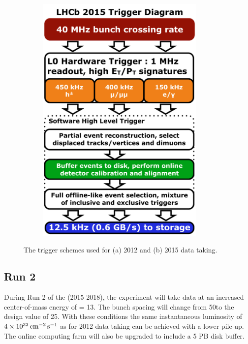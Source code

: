 \begin{figure}[!tb]
\begin{subfigure}{0.49\textwidth}
\includegraphics[width=0.9\textwidth]{figs/detector/trigger-run2.pdf}
\caption{}
\label{fig:trigger:run2}
\end{subfigure}
\caption{The trigger schemes used for (a) 2012 and (b) 2015 data taking.}
\label{fig:trigger}
\end{figure}

\subsection{\lhcb Run 2}
\label{sec:lhcb:lhcb-run2}

During Run 2 of the \lhc (2015-2018), the \lhcb experiment will take data at an increased center-of-mass energy of \sqs = 13\tev. The bunch spacing will change from 50\ns to the design value of 25\ns. With these conditions the same instantaneous luminosity of $4\times10^{32}\mathrm{ \,cm}^{-2}\mathrm{{\,s}}^{-1}$ as for 2012 data taking can be achieved with a lower pile-up. The online computing farm will also be upgraded to include a 5 PB disk buffer. 

